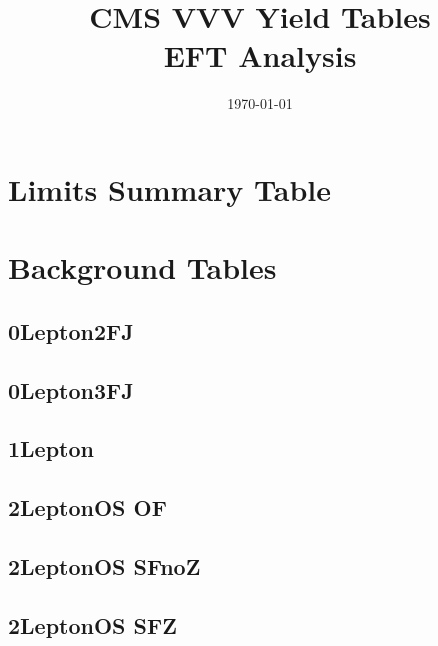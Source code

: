 \documentclass[landscape, 12pt,letterpaper]{article}
\title{CMS VVV Yield Tables\\EFT Analysis}
\author{}
\date{\today}
\begin{document}
\maketitle
\thispagestyle{empty}

\newpage

\section{Limits Summary Table}

\newpage

\section{Background Tables}
\subsection{0Lepton2FJ }


\newpage

\subsection{0Lepton3FJ }


\newpage

\subsection{1Lepton }


\newpage

\subsection{2LeptonOS OF}


\newpage

\subsection{2LeptonOS SFnoZ}


\newpage

\subsection{2LeptonOS SFZ}


\newpage
\end{document}
